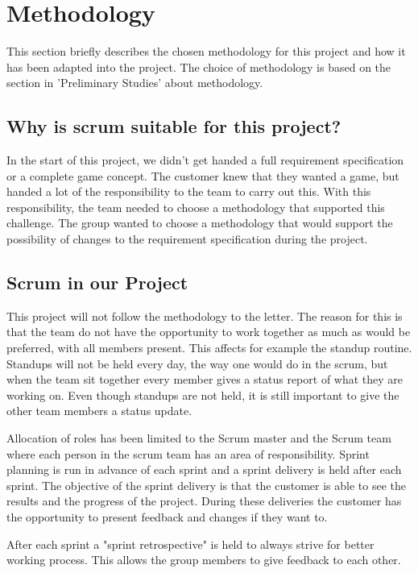 \section{Methodology}

    This section briefly describes the chosen methodology for this project and how 
    it has been adapted into the project. The choice of methodology is based on the
    section in 'Preliminary Studies' about methodology.

\subsection*{Why is scrum suitable for this project?}

    In the start of this project, we didn't get handed a full requirement specification 
    or a complete game concept. The customer knew that they wanted a game, but handed a 
    lot of the responsibility to the team to carry out this. With this responsibility, 
    the team needed to choose a methodology that supported this challenge. The group 
    wanted to choose a methodology that would support the possibility of changes to the 
    requirement specification during the project. 

\subsection*{Scrum in our Project}

    This project will not follow the methodology to the letter. The reason for this is 
    that the team do not have the opportunity to work together as much as would be 
    preferred, with all members present. This affects for example the standup routine. 
    Standups will not be held every day, the way one would do in the scrum, but when the 
    team sit together every member gives a status report of what they are working on. 
    Even though standups are not held, it is still important to give the other team 
    members a status update.

    Allocation of roles has been limited to the Scrum master and the Scrum team where 
    each person in the scrum team has an area of responsibility. Sprint planning is run 
    in advance of each sprint and a sprint delivery is held after each sprint. The 
    objective of the sprint delivery is that the customer is able to see the results 
    and the progress of the project. During these deliveries the customer has the 
    opportunity to present feedback and changes if they want to.

    After each sprint a "sprint retrospective" is held to always strive for better working 
    process. This allows the group members to give feedback to each other.

